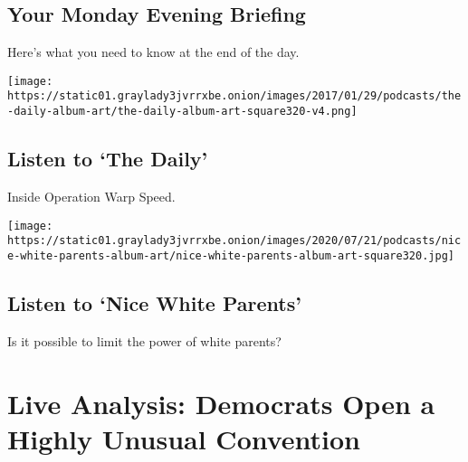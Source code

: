 \href{/2020/08/17/briefing/democrats-postal-service-rage-moms.html}{}

\hypertarget{your-monday-evening-briefing}{%
\subsection{Your Monday Evening
Briefing}\label{your-monday-evening-briefing}}

Here's what you need to know at the end of the day.

\href{/2020/08/17/podcasts/the-daily/trump-coronavirus-vaccine-covid.html}{}

\texttt{[image: https://static01.graylady3jvrrxbe.onion/images/2017/01/29/podcasts/the-daily-album-art/the-daily-album-art-square320-v4.png]}

\href{/2020/08/17/podcasts/the-daily/trump-coronavirus-vaccine-covid.html}{}

\hypertarget{listen-to-the-daily}{%
\subsection{Listen to `The Daily'}\label{listen-to-the-daily}}

Inside Operation Warp Speed.

\href{/2020/08/13/podcasts/nice-white-parents-school.html}{}

\texttt{[image: https://static01.graylady3jvrrxbe.onion/images/2020/07/21/podcasts/nice-white-parents-album-art/nice-white-parents-album-art-square320.jpg]}

\href{/2020/08/13/podcasts/nice-white-parents-school.html}{}

\hypertarget{listen-to-nice-white-parents}{%
\subsection{Listen to `Nice White
Parents'}\label{listen-to-nice-white-parents}}

Is it possible to limit the power of white parents?

\href{https://www.nytimes3xbfgragh.onion/interactive/2020/08/17/us/politics/democratic-national-convention-live-stream-analysis.html}{}

\hypertarget{live-analysis-democrats-open-a-highly-unusual-convention}{%
\section{Live Analysis: Democrats Open a Highly Unusual
Convention}\label{live-analysis-democrats-open-a-highly-unusual-convention}}

